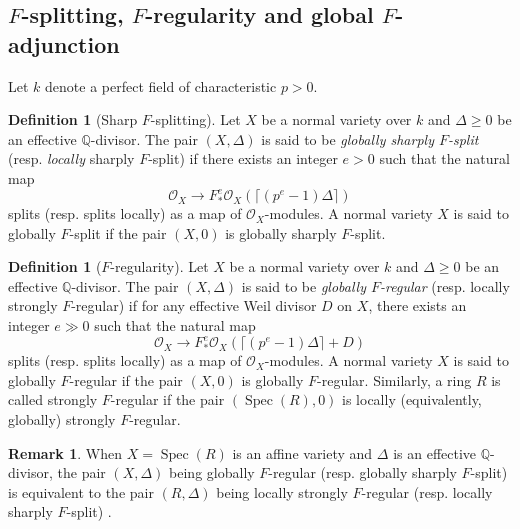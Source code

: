 \documentclass[11pt,reqno]{amsart}
\newcommand{\Q}{\mathbb{Q}}
\newcommand{\cO}{\mathcal{O}}
\DeclareMathOperator{\Spec}{Spec}
\numberwithin{equation}{section}
\theoremstyle{definition}
\newtheorem{rem}[prop] {Remark}
\newtheorem{defi}[prop] {Definition}
\begin{document}
\subsection{$F$-splitting, $F$-regularity and global $F$-adjunction} Let $k$ denote a perfect field of characteristic $p>0$.


 


\begin{defi}[Sharp $F$-splitting] \cite[Definition 3.1]{SchwedeSmithLogFanoVsGloballyFRegular} \label{defnsharpFsplitting}  Let $X$ be a normal variety over $k$ and $\Delta \geq 0$ be an effective $\Q$-divisor. The pair $(X, \Delta) $ is said to be \emph{globally sharply $F$-split} (resp. \emph{locally} sharply $F$-split) if there exists an integer $e > 0$ such that the natural map 
\begin{equation*} 
\cO_X \to F^e_* \cO_X( \lceil (p^e -1) \Delta \rceil)
 \end{equation*}
splits (resp. splits locally) as a map of $\cO_{X}$-modules.
A normal variety $X$ is said to globally $F$-split if the pair $(X, 0)$ is globally sharply $F$-split. 
\end{defi}

\begin{defi}[$F$-regularity]\label{defn.GlobFreg} \cite[Definition 3.1]{SchwedeSmithLogFanoVsGloballyFRegular} Let $X$ be a normal variety over $k$ and $\Delta \geq 0$ be an effective $\Q$-divisor. The pair $(X, \Delta) $ is said to be \emph{globally $F$-regular} (resp. locally strongly $F$-regular) if for any effective Weil divisor $D$ on $X$, there exists an integer $e \gg 0$ such that the natural map 
\begin{equation*} 
\cO_X \to F^e_* \cO_X( \lceil (p^e -1) \Delta \rceil + D)
 \end{equation*}
splits (resp. splits locally) as a map of $\cO_{X}$-modules.
A normal variety $X$ is said to globally $F$-regular if the pair $(X, 0)$ is globally $F$-regular. Similarly, a ring $R$ is called strongly $F$-regular if the pair $(\Spec(R), 0)$ is locally (equivalently, globally) strongly $F$-regular.
\end{defi}



\begin{rem} When $X= \Spec(R)$ is an affine variety and $\Delta$ is an effective $\Q$-divisor, the pair $(X, \Delta)$ being globally $F$-regular (resp. globally sharply $F$-split) is equivalent to the pair $(R, \Delta)$ being locally strongly $F$-regular (resp. locally sharply $F$-split) \cite{SchwedeSmithLogFanoVsGloballyFRegular}.
\end{rem}
\end{document}
